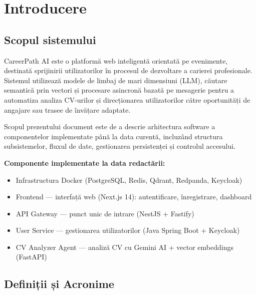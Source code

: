 \documentclass[12pt, a4paper]{report}
\begin{document}
\tableofcontents
\clearpage

\chapter{Introducere}

\section{Scopul sistemului}

CareerPath AI este o platformă web inteligentă orientată pe evenimente, destinată
sprijinirii utilizatorilor în procesul de dezvoltare a carierei profesionale. Sistemul
utilizează modele de limbaj de mari dimensiuni (LLM), căutare semantică prin vectori și
procesare asincronă bazată pe mesagerie pentru a automatiza analiza CV-urilor și
direcționarea utilizatorilor către oportunități de angajare sau trasee de învățare adaptate.

Scopul prezentului document este de a descrie arhitectura software a componentelor
implementate până la data curentă, incluzând structura subsistemelor, fluxul de date,
gestionarea persistenței și controlul accesului.

\textbf{Componente implementate la data redactării:}
\begin{itemize}[leftmargin=*]
  \item Infrastructura Docker (PostgreSQL, Redis, Qdrant, Redpanda, Keycloak)
  \item Frontend — interfață web (Next.js 14): autentificare, înregistrare, dashboard
  \item API Gateway — punct unic de intrare (NestJS + Fastify)
  \item User Service — gestionarea utilizatorilor (Java Spring Boot + Keycloak)
  \item CV Analyzer Agent — analiză CV cu Gemini AI + vector embeddings (FastAPI)
\end{itemize}

\section{Definiții și Acronime}
\end{document}
